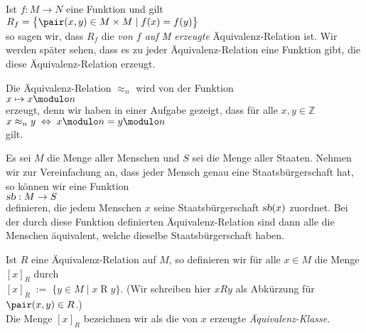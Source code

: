 \remark
Ist $f: M \rightarrow N$ eine Funktion und gilt
\\[0.2cm]
\hspace*{1.3cm}
$R_f = \bigl\{ \pair(x,y) \in M \times M \mid f(x) = f(y) \bigr\}$ 
\\[0.2cm]
so sagen wir, dass $R_f$ die \emph{von $f$ auf M erzeugte} \"{A}quivalenz-Relation ist.  Wir werden
sp\"{a}ter sehen, dass es zu jeder  \"{A}quivalenz-Relation eine Funktion gibt, die diese
\"{A}quivalenz-Relation erzeugt. \eox 


\example 
Die \"{A}quivalenz-Relation $\approx_n$ wird von der Funktion
\\[0.2cm]
\hspace*{1.3cm}
$x \mapsto x \modulo n$
\\[0.2cm]
erzeugt, denn wir haben in einer Aufgabe gezeigt, dass f\"{u}r alle $x,y \in \mathbb{Z}$ 
\\[0.2cm]
\hspace*{1.3cm}
$x \approx_n y \;\Leftrightarrow\; x \modulo n = y \modulo n$
\\[0.2cm]
gilt.
\eox


\example
Es sei $M$ die Menge aller Menschen und $S$ sei die Menge aller Staaten.  Nehmen wir zur
Vereinfachung an, dass jeder Mensch genau eine Staatsb\"{u}rgerschaft hat, so k\"{o}nnen wir eine Funktion
\\[0.2cm]
\hspace*{1.3cm}
$\textsl{sb}: M \rightarrow S$
\\[0.2cm]
definieren, die jedem Menschen $x$ seine Staatsb\"{u}rgerschaft $\textsl{sb}(x)$ zuordnet.  Bei der durch
diese Funktion definierten \"{A}quivalenz-Relation sind dann alle die Menschen \"{a}quivalent, welche dieselbe
Staatsb\"{u}rgerschaft haben.  \eox
\pagebreak

\begin{Definition}
Ist $R$ eine \"{A}quivalenz-Relation auf $M$, so definieren wir f\"{u}r alle $x \in M$ 
die Menge $[x]_R$ durch \\[0.2cm]
\hspace*{1.3cm} $[x]_R \;:=\; \bigl\{ y \in M \mid x \mathop{R} y \bigr\}$. \qquad
(Wir schreiben hier $x R y$ als Abk\"{u}rzung f\"{u}r $\pair(x, y) \in R$.) 
\\[0.2cm]
Die Menge $[x]_R$ bezeichnen wir als die von $x$ erzeugte \emph{\"{A}quivalenz-Klasse}.  \eox
\end{Definition}

